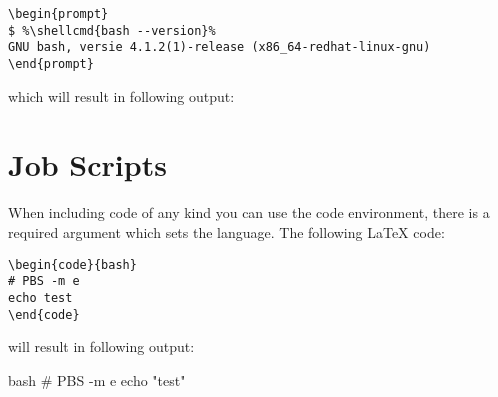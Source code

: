 \documentclass[11pt,a4paper,oneside]{book}
\newcommand{\shellcmd}[1]{\textbf{\texttt{\footnotesize #1}\\}}
\begin{document}
\begin{verbatim}
\begin{prompt}
$ %\shellcmd{bash --version}%
GNU bash, versie 4.1.2(1)-release (x86_64-redhat-linux-gnu)
\end{prompt}
\end{verbatim}

which will result in following output:

\section{Job Scripts}
\label{sec:job-scripts}

When including code of any kind you can use the code environment, there is a
required argument which sets the language. The following LaTeX code:

\begin{verbatim}
\begin{code}{bash}
# PBS -m e
echo test
\end{code}
\end{verbatim}

will result in following output:

\begin{code}{bash}
# PBS -m e
echo "test"
\end{code}
\end{document}
